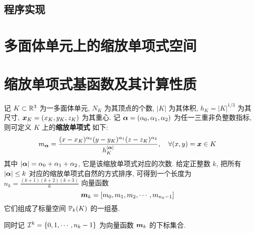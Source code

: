 \documentclass{article}
\begin{document}
\subsection{程序实现}
\cite{fealpy}
\section{多面体单元上的缩放单项式空间}

\section{缩放单项式基函数及其计算性质}
记 $K\subset{\mathbb R}^3$ 为一多面体单元,  $N_K$ 为其顶点的个数, $|K|$ 为其体积, $h_K
= |K|^{1/3}$ 为其尺寸, ${\boldsymbol x}_K =(x_K, y_K, z_K)$ 为其重心. 记 ${\bm \alpha} = (\alpha_0,
\alpha_1, \alpha_2)$ 为任一三重非负整数指标, 则可定义 $K$ 上的{\bf 缩放单项式} 如下:
\begin{equation}
    m_{\bm \alpha} = 
    \frac{(x - x_K)^{\alpha_0}(y - y_K)^{\alpha_1}(z - z_K)^{\alpha_2}}{h_K^{|{\bm \alpha}|}},\quad
    \forall (x, y) = {\boldsymbol x} \in K
    \label{eq:sp}
\end{equation}
其中 $|{\bm \alpha}| = \alpha_0 + \alpha_1 + \alpha_2$, 它是该缩放单项式对应的次数.  
给定正整数 $k$, 把所有 $|{\bm \alpha}|\leq k$ 对应的缩放单项式自然的方式排序, 
可得到一个长度为 $n_k = \frac{(k+1)(k+2)(k+3)}{6}$ 向量函数
\begin{equation*}
    {\boldsymbol m}_k = [m_0, m_1, m_2, \cdots, m_{n_k-1}]
\end{equation*}
它们组成了标量空间 ${\mathbb P}_k(K)$ 的一组基. 


同时记 ${\mathcal I}^k = \{0, 1, \cdots,
n_k-1\}$ 为向量函数 ${\boldsymbol m}_k$ 的下标集合.



\end{document}
